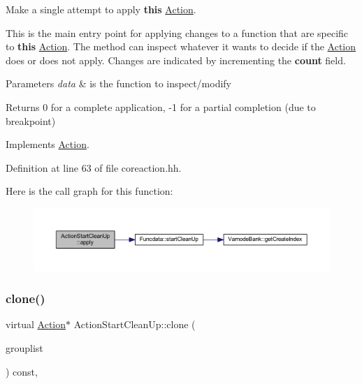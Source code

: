 Make a single attempt to apply {\bfseries{this}} \mbox{\hyperlink{class_action}{Action}}. 

This is the main entry point for applying changes to a function that are specific to {\bfseries{this}} \mbox{\hyperlink{class_action}{Action}}. The method can inspect whatever it wants to decide if the \mbox{\hyperlink{class_action}{Action}} does or does not apply. Changes are indicated by incrementing the {\bfseries{count}} field. 
\begin{DoxyParams}{Parameters}
{\em data} & is the function to inspect/modify \\
\hline
\end{DoxyParams}
\begin{DoxyReturn}{Returns}
0 for a complete application, -\/1 for a partial completion (due to breakpoint) 
\end{DoxyReturn}


Implements \mbox{\hyperlink{class_action_aac1c3999d6c685b15f5d9765a4d04173}{Action}}.



Definition at line 63 of file coreaction.\+hh.

Here is the call graph for this function\+:
\nopagebreak
\begin{figure}[H]
\begin{center}
\leavevmode
\includegraphics[width=350pt]{class_action_start_clean_up_a169a82db1316093f0e368a34d2df8538_cgraph}
\end{center}
\end{figure}
\mbox{\label{class_action_start_clean_up_ad9e7b95a0ee1607e600fad95f78fff93}} 
\subsubsection{\texorpdfstring{clone()}{clone()}}
{\footnotesize\ttfamily virtual \mbox{\hyperlink{class_action}{Action}}$\ast$ Action\+Start\+Clean\+Up\+::clone (\begin{DoxyParamCaption}\item[{const \mbox{\hyperlink{class_action_group_list}{Action\+Group\+List}} \&}]{grouplist }\end{DoxyParamCaption}) const\hspace{0.3cm}{\ttfamily [inline]}, {\ttfamily [virtual]}}



